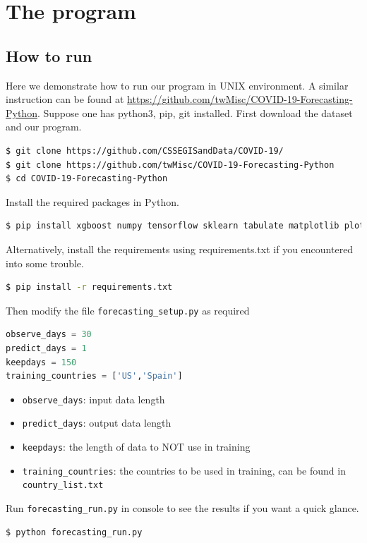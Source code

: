 \documentclass[a4paper,12pt]{article}
\begin{document}
\section{The program}
\subsection{How to run}
Here we demonstrate how to run our program in UNIX environment. A similar instruction can be found at \href{https://github.com/twMisc/COVID-19-Forecasting-Python}{https://github.com/twMisc/COVID-19-Forecasting-Python}. Suppose one has python3, pip, git installed. First download the dataset and our program. 
\lstset{style=mystyle}
\begin{lstlisting}[language=bash]
$ git clone https://github.com/CSSEGISandData/COVID-19/
$ git clone https://github.com/twMisc/COVID-19-Forecasting-Python
$ cd COVID-19-Forecasting-Python
\end{lstlisting}
Install the required packages in Python.
\begin{lstlisting}[language=bash]
$ pip install xgboost numpy tensorflow sklearn tabulate matplotlib plotly pandas
\end{lstlisting}
Alternatively, install the requirements using requirements.txt if you encountered into some trouble.
\begin{lstlisting}[language=bash]
$ pip install -r requirements.txt    
\end{lstlisting}
Then modify the file \texttt{forecasting\_setup.py} as required
\begin{lstlisting}[language=Python]
observe_days = 30
predict_days = 1
keepdays = 150
training_countries = ['US','Spain']
\end{lstlisting}
\begin{itemize}
    \item \texttt{observe\_days}: input data length
    \item \texttt{predict\_days}: output data length
    \item \texttt{keepdays}: the length of data to NOT use in training
    \item \texttt{training\_countries}: the countries to be used in training, can be found in \texttt{country\_list.txt}
\end{itemize}
Run \texttt{forecasting\_run.py} in console to see the results if you want a quick glance.
\begin{lstlisting}[language=bash]
$ python forecasting_run.py
\end{lstlisting}
\end{document}
